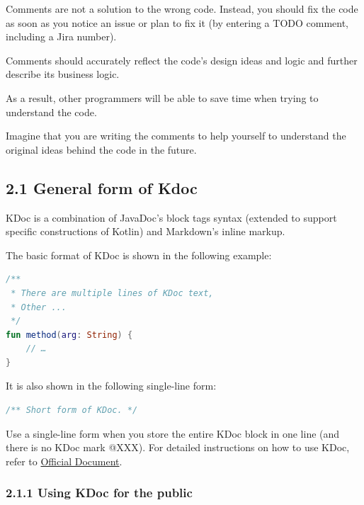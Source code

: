 {{{{{{{{{{{{{{{{Comments are not a solution to the wrong code. Instead, you should fix the code as soon as you notice an issue or plan to fix it (by entering a TODO comment, including a Jira number).

Comments should accurately reflect the code's design ideas and logic and further describe its business logic.

As a result, other programmers will be able to save time when trying to understand the code.

Imagine that you are writing the comments to help yourself to understand the original ideas behind the code in the future. 



\subsection*{\textbf{2.1 General form of Kdoc}}

\label{sec:2.1}



KDoc is a combination of JavaDoc's block tags syntax (extended to support specific constructions of Kotlin) and Markdown's inline markup.

The basic format of KDoc is shown in the following example:



\begin{lstlisting}[language=Kotlin]
 /**
 * There are multiple lines of KDoc text,
 * Other ...
 */
fun method(arg: String) {
    // …
}
\end{lstlisting}


It is also shown in the following single-line form:



\begin{lstlisting}[language=Kotlin]
 /** Short form of KDoc. */
\end{lstlisting}
Use a single-line form when you store the entire KDoc block in one line (and there is no KDoc mark @XXX). For detailed instructions on how to use KDoc, refer to \href{https://docs.oracle.com/en/Kotlin/Kotlinse/11/tools/KDoc.html}{Official Document}.



\subsubsection*{\textbf{2.1.1 Using KDoc for the public}}
\leavevmode\newline

}}}}}}}}}}}}}}}}
